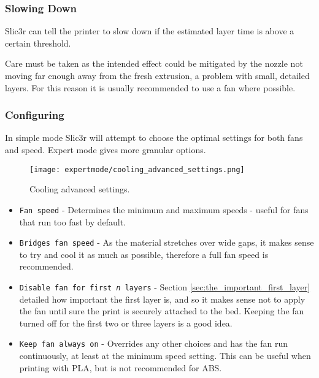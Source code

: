 
\subsubsection{Slowing Down} %
\label{sub:slowing_down}
Slic3r can tell the printer to slow down if the estimated layer time is above a certain threshold.

Care must be taken as the intended effect could be mitigated by the nozzle not moving far enough away from the fresh extrusion, a problem with small, detailed layers.  For this reason it is usually recommended to use a fan where possible.

\subsubsection{Configuring} %
\label{sub:configuring_cooling}

In simple mode Slic3r will attempt to choose the optimal settings for both fans and speed.  Expert mode gives more granular options.

\begin{figure}[H]
\centering
\texttt{[image: expertmode/cooling\_advanced\_settings.png]}
\caption{Cooling advanced settings.}
\label{fig:cooling_advanced_settings}
\end{figure}

\begin{itemize}
	\item \texttt{Fan speed}  - Determines the minimum and maximum speeds - useful for fans that run too fast by default.
	\item \texttt{Bridges fan speed}  - As the material stretches over wide gaps, it makes sense to try and cool it as much as possible, therefore a full fan speed is recommended.
	\item \texttt{Disable fan for first \textit{n} layers}  - Section \ref{sec:the_important_first_layer} detailed how important the first layer is, and so it makes sense not to apply the fan until sure the print is securely attached to the bed.  Keeping the fan turned off for the first two or three layers is a good idea.
	\item \texttt{Keep fan always on}  - Overrides any other choices and has the fan run continuously, at least at the minimum speed setting.  This can be useful when printing with PLA, but is not recommended for ABS.
\end{itemize}

